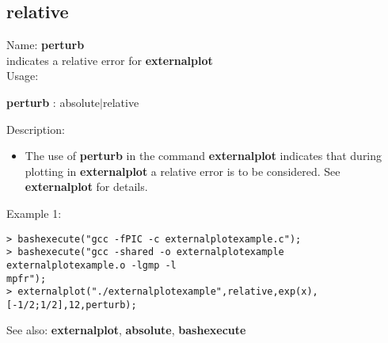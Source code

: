 \subsection{ relative }
\noindent Name: \textbf{perturb}\\
indicates a relative error for \textbf{externalplot}\\

\noindent Usage: 
\begin{center}
\textbf{perturb} : \textsf{absolute$|$relative}\\
\end{center}
\noindent Description: \begin{itemize}

\item The use of \textbf{perturb} in the command \textbf{externalplot} indicates that during
   plotting in \textbf{externalplot} a relative error is to be considered.
   See \textbf{externalplot} for details.
\end{itemize}
\noindent Example 1: 
\begin{center}\begin{minipage}{15cm}\begin{Verbatim}[frame=single]
> bashexecute("gcc -fPIC -c externalplotexample.c");
> bashexecute("gcc -shared -o externalplotexample externalplotexample.o -lgmp -l
mpfr");
> externalplot("./externalplotexample",relative,exp(x),[-1/2;1/2],12,perturb);
\end{Verbatim}
\end{minipage}\end{center}
See also: \textbf{externalplot}, \textbf{absolute}, \textbf{bashexecute}
